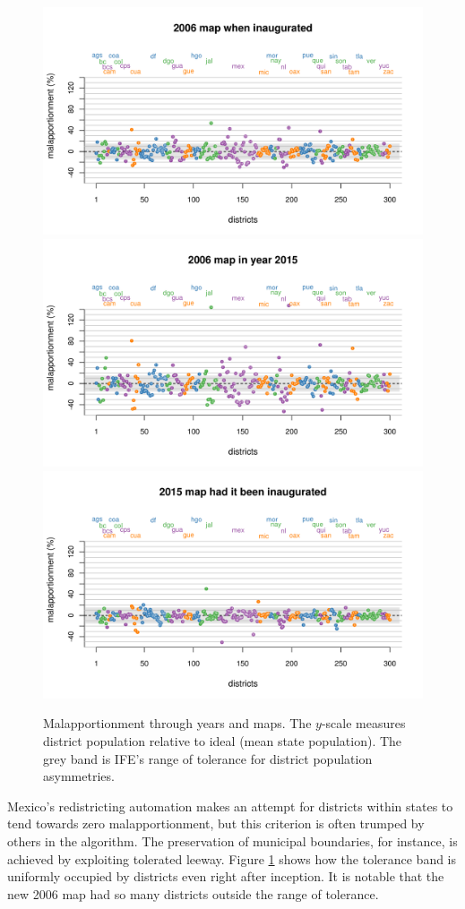 \documentclass[letter,12pt]{article}
\begin{document}
\begin{figure}
\begin{center}
    \includegraphics[width=.7\columnwidth]{malapp2006d0.pdf} \\
    \includegraphics[width=.7\columnwidth]{malapp2015d0.pdf} \\
    \includegraphics[width=.7\columnwidth]{malapp2015d3.pdf} \\
  \caption{Malapportionment through years and maps. The $y$-scale measures district population relative to ideal (mean state population). The grey band is IFE's range of tolerance for district population asymmetries.}\label{F:malapp}
\end{center}
\end{figure}

Mexico's redistricting automation makes an attempt for districts within states to tend towards zero malapportionment, but this criterion is often trumped by others in the algorithm. The preservation of municipal boundaries, for instance, is achieved by exploiting tolerated leeway. Figure \ref{F:malapp} shows how the tolerance band is uniformly occupied by districts even right after inception. It is notable that the new 2006 map had so many districts outside the range of tolerance. 
\end{document}
